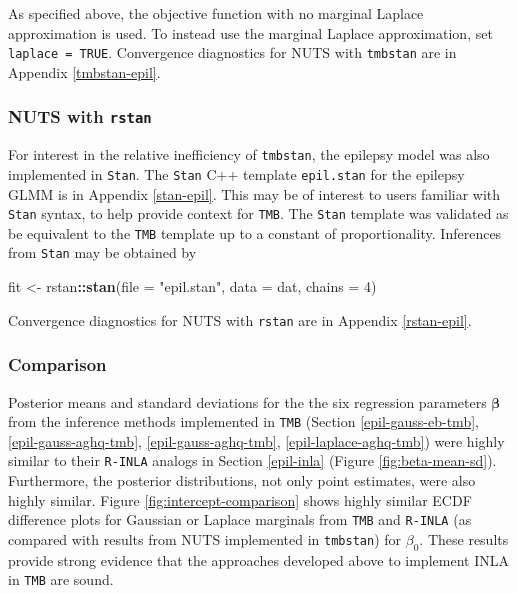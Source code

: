 \documentclass[a4paper, nobind]{templates/ociamthesis}
\newenvironment{Shaded}{\begin{snugshade}}{\end{snugshade}}
\newcommand{\AttributeTok}[1]{\textcolor[rgb]{0.13,0.29,0.53}{#1}}
\newcommand{\DecValTok}[1]{\textcolor[rgb]{0.00,0.00,0.81}{#1}}
\newcommand{\FunctionTok}[1]{\textcolor[rgb]{0.13,0.29,0.53}{\textbf{#1}}}
\newcommand{\NormalTok}[1]{#1}
\newcommand{\OtherTok}[1]{\textcolor[rgb]{0.56,0.35,0.01}{#1}}
\newcommand{\SpecialCharTok}[1]{\textcolor[rgb]{0.81,0.36,0.00}{\textbf{#1}}}
\newcommand{\StringTok}[1]{\textcolor[rgb]{0.31,0.60,0.02}{#1}}
\renewenvironment{Shaded}
{
  \vspace{10pt}%
  \begin{snugshade}%
}{%
  \end{snugshade}%
  \vspace{8pt}%
}
\begin{document}
As specified above, the objective function with no marginal Laplace approximation is used.
To instead use the marginal Laplace approximation, set \texttt{laplace\ =\ TRUE}.
Convergence diagnostics for NUTS with \texttt{tmbstan} are in Appendix \ref{tmbstan-epil}.

\hypertarget{epil-nuts-rstan}{%
\subsubsection{\texorpdfstring{NUTS with \texttt{rstan}}{NUTS with rstan}}\label{epil-nuts-rstan}}

For interest in the relative inefficiency of \texttt{tmbstan}, the epilepsy model was also implemented in \texttt{Stan}.
The \texttt{Stan} C++ template \texttt{epil.stan} for the epilepsy GLMM is in Appendix \ref{stan-epil}.
This may be of interest to users familiar with \texttt{Stan} syntax, to help provide context for \texttt{TMB}.
The \texttt{Stan} template was validated as be equivalent to the \texttt{TMB} template up to a constant of proportionality.
Inferences from \texttt{Stan} may be obtained by

\begin{Shaded}
\begin{Highlighting}[]
\NormalTok{fit }\OtherTok{\textless{}{-}}\NormalTok{ rstan}\SpecialCharTok{::}\FunctionTok{stan}\NormalTok{(}\AttributeTok{file =} \StringTok{"epil.stan"}\NormalTok{, }\AttributeTok{data =}\NormalTok{ dat, }\AttributeTok{chains =} \DecValTok{4}\NormalTok{)}
\end{Highlighting}
\end{Shaded}

Convergence diagnostics for NUTS with \texttt{rstan} are in Appendix \ref{rstan-epil}.

\hypertarget{epil-comparison}{%
\subsubsection{Comparison}\label{epil-comparison}}

Posterior means and standard deviations for the the six regression parameters \(\boldsymbol{\mathbf{\beta}}\) from the inference methods implemented in \texttt{TMB} (Section \ref{epil-gauss-eb-tmb}, \ref{epil-gauss-aghq-tmb}, \ref{epil-gauss-aghq-tmb}, \ref{epil-laplace-aghq-tmb}) were highly similar to their \texttt{R-INLA} analogs in Section \ref{epil-inla} (Figure \ref{fig:beta-mean-sd}).
Furthermore, the posterior distributions, not only point estimates, were also highly similar.
Figure \ref{fig:intercept-comparison} shows highly similar ECDF difference plots for Gaussian or Laplace marginals from \texttt{TMB} and \texttt{R-INLA} (as compared with results from NUTS implemented in \texttt{tmbstan}) for \(\beta_0\).
These results provide strong evidence that the approaches developed above to implement INLA in \texttt{TMB} are sound.
\end{document}
